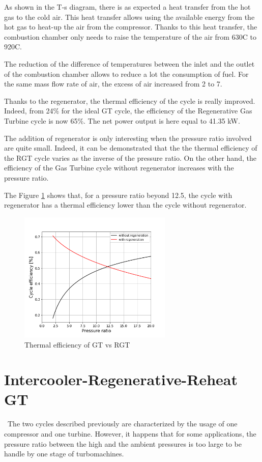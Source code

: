 As shown in the T-s diagram, there is as expected a heat transfer from the hot gas to the cold air. This heat transfer allows using the available energy from the hot gas to heat-up the air from the compressor. Thanks to this heat transfer, the combustion chamber only needs to raise the temperature of the air from 630\degree C to 920\degree C. 

The reduction of the difference of temperatures between the inlet and the outlet of the combustion chamber allows to reduce a lot the consumption of fuel. For the same mass flow rate of air, the excess of air increased from 2 to 7.   

Thanks to the regenerator, the thermal efficiency of the cycle is really improved. Indeed, from 24\% for the ideal GT cycle, the efficiency of the Regenerative Gas Turbine cycle is now 65\%. The net power output is here equal to 41.35 kW.

The addition of regenerator is only interesting when the pressure ratio involved are quite small. Indeed, it can be demonstrated that the the thermal efficiency of the RGT cycle varies as the inverse of the pressure ratio. On the other hand, the efficiency of the Gas Turbine cycle without regenerator increases with the pressure ratio. 

The Figure \ref{fig:C5_eff_RGT-GT} shows that, for a pressure ratio beyond 12.5, the cycle with regenerator has a thermal efficiency lower than the cycle without regenerator. 

\begin{figure}[h]
    \centering
    \includegraphics[width=0.65\textwidth]{Chapitre_5/Images/Efficiency_ideal_Brayton_regen.png}
    \caption{Thermal efficiency of GT vs RGT}
    \label{fig:C5_eff_RGT-GT}
\end{figure}

\section{Intercooler-Regenerative-Reheat GT}
\quad\ The two cycles described previously are characterized by the usage of one compressor and one turbine. However, it happens that for some applications, the pressure ratio between the high and the ambient pressures is too large to be handle by one stage of turbomachines.

